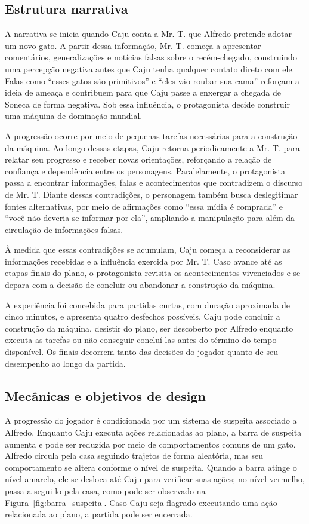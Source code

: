 \documentclass[12pt]{article}
\begin{document}
\subsection{Estrutura narrativa}

A narrativa se inicia quando Caju conta a Mr. T. que Alfredo pretende adotar um novo gato. A partir dessa informação, Mr. T. começa a apresentar comentários, generalizações e notícias falsas sobre o recém-chegado, construindo uma percepção negativa antes que Caju tenha qualquer contato direto com ele. Falas como ``esses gatos são primitivos'' e ``eles vão roubar sua cama'' reforçam a ideia de ameaça e contribuem para que Caju passe a enxergar a chegada de Soneca de forma negativa. Sob essa influência, o protagonista decide construir uma máquina de dominação mundial.

A progressão ocorre por meio de pequenas tarefas necessárias para a construção da máquina. Ao longo dessas etapas, Caju retorna periodicamente a Mr. T. para relatar seu progresso e receber novas orientações, reforçando a relação de confiança e dependência entre os personagens. Paralelamente, o protagonista passa a encontrar informações, falas e acontecimentos que contradizem o discurso de Mr. T. Diante dessas contradições, o personagem também busca deslegitimar fontes alternativas, por meio de afirmações como ``essa mídia é comprada'' e ``você não deveria se informar por ela'', ampliando a manipulação para além da circulação de informações falsas.

À medida que essas contradições se acumulam, Caju começa a reconsiderar as informações recebidas e a influência exercida por Mr. T. Caso avance até as etapas finais do plano, o protagonista revisita os acontecimentos vivenciados e se depara com a decisão de concluir ou abandonar a construção da máquina.

A experiência foi concebida para partidas curtas, com duração aproximada de cinco minutos, e apresenta quatro desfechos possíveis. Caju pode concluir a construção da máquina, desistir do plano, ser descoberto por Alfredo enquanto executa as tarefas ou não conseguir concluí-las antes do término do tempo disponível. Os finais decorrem tanto das decisões do jogador quanto de seu desempenho ao longo da partida.

\subsection{Mecânicas e objetivos de design}

A progressão do jogador é condicionada por um sistema de suspeita associado a Alfredo. Enquanto Caju executa ações relacionadas ao plano, a barra de suspeita aumenta e pode ser reduzida por meio de comportamentos comuns de um gato. Alfredo circula pela casa seguindo trajetos de forma aleatória, mas seu comportamento se altera conforme o nível de suspeita. Quando a barra atinge o nível amarelo, ele se desloca até Caju para verificar suas ações; no nível vermelho, passa a segui-lo pela casa, como pode ser observado na Figura~\ref{fig:barra_suspeita}. Caso Caju seja flagrado executando uma ação relacionada ao plano, a partida pode ser encerrada.
\end{document}
